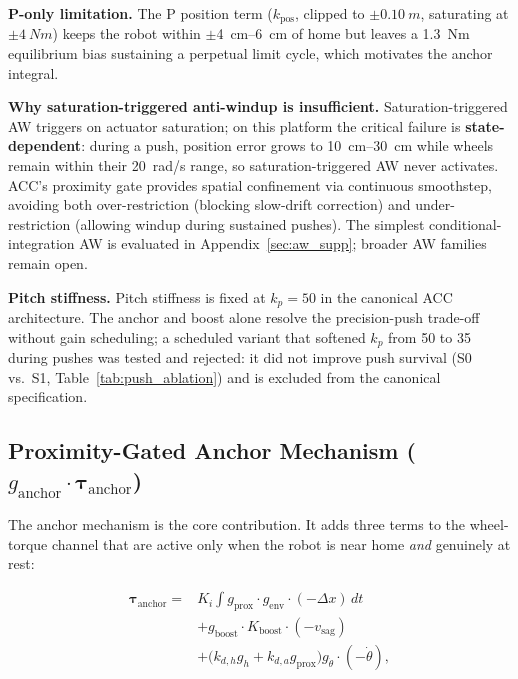 \documentclass[a4paper,fleqn]{cas-dc}
\begin{document}
\textbf{P-only limitation.}
The P position term ($k_{\text{pos}}$, clipped to $\pm\SI{0.10}{m}$, saturating at $\pm\SI{4}{Nm}$) keeps the robot within $\pm$\SIrange{4}{6}{cm} of home but leaves a \SI{1.3}{Nm} equilibrium bias sustaining a perpetual limit cycle, which motivates the anchor integral.

\textbf{Why saturation-triggered anti-windup is insufficient.}
Saturation-triggered AW triggers on actuator saturation; on this platform the critical failure is \textbf{state-dependent}: during a push, position error grows to \SIrange{10}{30}{cm} while wheels remain within their \SI{20}{rad/s} range, so saturation-triggered AW never activates.
ACC's proximity gate provides spatial confinement via continuous smoothstep, avoiding both over-restriction (blocking slow-drift correction) and under-restriction (allowing windup during sustained pushes).
The simplest conditional-integration AW is evaluated in Appendix~\ref{sec:aw_supp}; broader AW families remain open.

\textbf{Pitch stiffness.}
Pitch stiffness is fixed at $k_p{=}50$ in the canonical ACC architecture. The anchor and boost alone resolve the precision-push trade-off without gain scheduling; a scheduled variant that softened $k_p$ from 50 to 35 during pushes was tested and rejected: it did not improve push survival (S0 vs.\ S1, Table~\ref{tab:push_ablation}) and is excluded from the canonical specification.

\subsection{Proximity-Gated Anchor Mechanism ($g_{\text{anchor}}\!\cdot\!\boldsymbol{\tau}_{\text{anchor}}$)}
\label{sec:anchor}

The anchor mechanism is the core contribution. It adds three terms to the wheel-torque channel that are active only when the robot is near home \emph{and} genuinely at rest:

\begin{equation}
\begin{split}
\boldsymbol{\tau}_{\text{anchor}} = {}
& K_i\!\int\! g_{\text{prox}}\cdot g_{\text{env}}\cdot(-\Delta x)\,dt\\
& + g_{\text{boost}}\cdot K_{\text{boost}}\cdot(-v_{\text{sag}})\\
& + \bigl(k_{d,h}g_h + k_{d,a}g_{\text{prox}}\bigr)g_{\dot{\theta}}\cdot(-\dot{\theta}),
\end{split}
\label{eq:anchor}
\end{equation}
\end{document}
